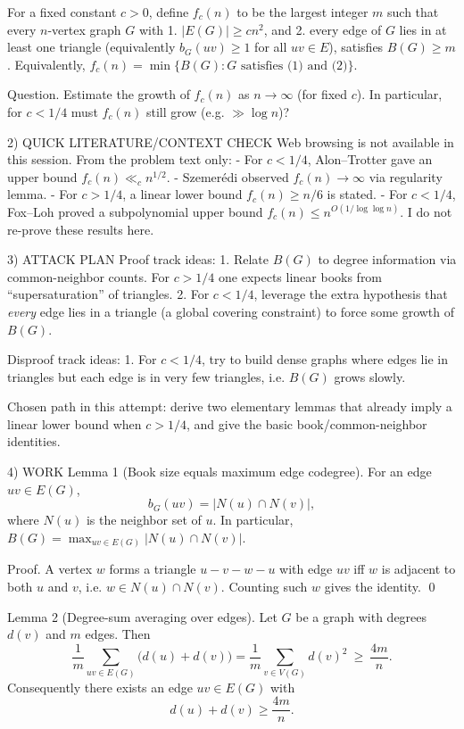 For a fixed constant $c>0$, define $f_c(n)$ to be the largest integer $m$ such that every $n$-vertex graph $G$ with
1. $|E(G)|\ge c n^2$, and
2. every edge of $G$ lies in at least one triangle (equivalently $b_G(uv)\ge 1$ for all $uv\in E$),
satisfies $B(G)\ge m$.
Equivalently, $f_c(n)=\min\{B(G): G \text{ satisfies (1) and (2)}\}$.

Question.
Estimate the growth of $f_c(n)$ as $n\to\infty$ (for fixed $c$). In particular, for $c<1/4$ must $f_c(n)$ still grow (e.g. $\gg\log n$)?

2) QUICK LITERATURE/CONTEXT CHECK
Web browsing is not available in this session.
From the problem text only:
- For $c<1/4$, Alon--Trotter gave an upper bound $f_c(n)\ll_c n^{1/2}$.
- Szemer\'{e}di observed $f_c(n)\to\infty$ via regularity lemma.
- For $c>1/4$, a linear lower bound $f_c(n)\ge n/6$ is stated.
- For $c<1/4$, Fox--Loh proved a subpolynomial upper bound $f_c(n)\le n^{O(1/\log\log n)}$.
I do not re-prove these results here.

3) ATTACK PLAN
Proof track ideas:
1. Relate $B(G)$ to degree information via common-neighbor counts. For $c>1/4$ one expects linear books from ``supersaturation'' of triangles.
2. For $c<1/4$, leverage the extra hypothesis that \emph{every} edge lies in a triangle (a global covering constraint) to force some growth of $B(G)$.

Disproof track ideas:
1. For $c<1/4$, try to build dense graphs where edges lie in triangles but each edge is in very few triangles, i.e. $B(G)$ grows slowly.

Chosen path in this attempt: derive two elementary lemmas that already imply a linear lower bound when $c>1/4$, and give the basic book/common-neighbor identities.

4) WORK
Lemma 1 (Book size equals maximum edge codegree).
For an edge $uv\in E(G)$,
\[b_G(uv)=|N(u)\cap N(v)|,\]
where $N(u)$ is the neighbor set of $u$. In particular, $B(G)=\max_{uv\in E(G)} |N(u)\cap N(v)|$.

Proof.
A vertex $w$ forms a triangle $u-v-w-u$ with edge $uv$ iff $w$ is adjacent to both $u$ and $v$, i.e. $w\in N(u)\cap N(v)$.
Counting such $w$ gives the identity. \qed

Lemma 2 (Degree-sum averaging over edges).
Let $G$ be a graph with degrees $d(v)$ and $m$ edges. Then
\[\frac{1}{m}\sum_{uv\in E(G)}\big(d(u)+d(v)\big) = \frac{1}{m}\sum_{v\in V(G)} d(v)^2 \ \ge\ \frac{4m}{n}.\]
Consequently there exists an edge $uv\in E(G)$ with
\[d(u)+d(v)\ge \frac{4m}{n}.\]

